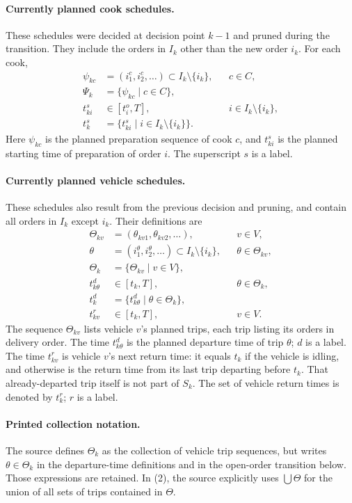 \documentclass{article}
\begin{document}
\paragraph{Currently planned cook schedules.}
These schedules were decided at decision point \(k-1\) and pruned during the transition. They include the orders in \(I_k\) other than the new order \(i_k\). For each cook,
\begin{align*}
\psi_{kc}&=(i^c_1,i^c_2,\ldots)\subset I_k\setminus\{i_k\}, &&c\in C,\\
\Psi_k&=\{\psi_{kc}\mid c\in C\},\\
t^s_{ki}&\in[t^o_i,T], &&i\in I_k\setminus\{i_k\},\\
t^s_k&=\{t^s_{ki}\mid i\in I_k\setminus\{i_k\}\}.
\end{align*}
Here \(\psi_{kc}\) is the planned preparation sequence of cook \(c\), and \(t^s_{ki}\) is the planned starting time of preparation of order \(i\). The superscript \(s\) is a label.

\paragraph{Currently planned vehicle schedules.}
These schedules also result from the previous decision and pruning, and contain all orders in \(I_k\) except \(i_k\). Their definitions are
\begin{align*}
\Theta_{kv}&=(\theta_{kv1},\theta_{kv2},\ldots), &&v\in V,\\
\theta&=(i^\theta_1,i^\theta_2,\ldots)\subset I_k\setminus\{i_k\}, &&\theta\in\Theta_{kv},\\
\Theta_k&=\{\Theta_{kv}\mid v\in V\},\\
t^d_{k\theta}&\in[t_k,T], &&\theta\in\Theta_k,\\
t^d_k&=\{t^d_{k\theta}\mid\theta\in\Theta_k\},\\
t^r_{kv}&\in[t_k,T], &&v\in V.
\end{align*}
The sequence \(\Theta_{kv}\) lists vehicle \(v\)'s planned trips, each trip listing its orders in delivery order. The time \(t^d_{k\theta}\) is the planned departure time of trip \(\theta\); \(d\) is a label. The time \(t^r_{kv}\) is vehicle \(v\)'s next return time: it equals \(t_k\) if the vehicle is idling, and otherwise is the return time from its last trip departing before \(t_k\). That already-departed trip itself is not part of \(S_k\). The set of vehicle return times is denoted by \(t^r_k\); \(r\) is a label.

\paragraph{Printed collection notation.}
The source defines \(\Theta_k\) as the collection of vehicle trip sequences, but writes \(\theta\in\Theta_k\) in the departure-time definitions and in the open-order transition below. Those expressions are retained. In (2), the source explicitly uses \(\bigcup\Theta\) for the union of all sets of trips contained in \(\Theta\).
\end{document}
